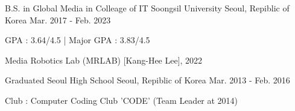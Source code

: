 


  \cventry
    {B.S. in Global Media in Colleage of IT} %
    {Soongsil University} %
    {Seoul, Repiblic of Korea} %
    {Mar. 2017 - Feb. 2023} %
    {
      \begin{cvitems} %
        \item {GPA : 3.64/4.5 | Major GPA : 3.83/4.5}
        \item {Media Robotics Lab (MRLAB) [Kang-Hee Lee], 2022 }
      \end{cvitems}
    }

  \cventry
    {Graduated} %
    {Seoul High School} %
    {Seoul, Repiblic of Korea} %
    {Mar. 2013 - Feb. 2016} %
    {
      \begin{cvitems} %
        \item {Club : Computer Coding Club 'CODE' (Team Leader at 2014)}
      \end{cvitems}
    }    

